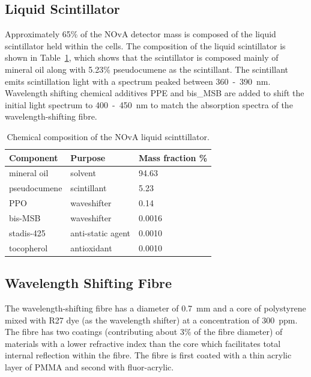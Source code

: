 \subsection{Liquid Scintillator}

Approximately 65\% of the NOvA detector mass is composed of the liquid
scintillator held within the cells. The composition of the liquid
scintillator is shown in Table~\ref{tab:scintComp}, which shows that
the scintillator is composed mainly of mineral oil along with 5.23\%
pseudocumene as the scintillant. The scintillant emits scintillation
light with a spectrum peaked between 360~-~390~nm. Wavelength shifting
chemical additives PPE and bis\_MSB are added to shift the initial
light spectrum to 400~-~450~nm to match the absorption spectra of the
wavelength-shifting fibre. 


\begin{table}
  \centering
  \begin{tabular}{ l | l | l }
    Component & Purpose & Mass fraction \% \\ \hline
    mineral oil & solvent & 94.63 \\
    pseudocumene & scintillant & 5.23 \\
    PPO & waveshifter & 0.14 \\
    bis-MSB & waveshifter & 0.0016 \\
    stadis-425 & anti-static agent & 0.0010 \\
    tocopherol & antioxidant & 0.0010 \\
  \end{tabular}
  \caption{Chemical composition of the NOvA liquid scinttillator. \cite{scintillatorComp} }
  \label{tab:scintComp}
\end{table}


\subsection{Wavelength Shifting Fibre}
The wavelength-shifting fibre has a diameter of 0.7~mm and a core of
polystyrene mixed with R27 dye (as the wavelength shifter) at a
concentration of 300~ppm. The fibre has two
coatings (contributing about 3\% of the fibre diameter) of materials
with a lower refractive index than the core
which facilitates total internal reflection within the fibre. The
fibre is first coated with a thin acrylic layer of PMMA and second
with fluor-acrylic. 

